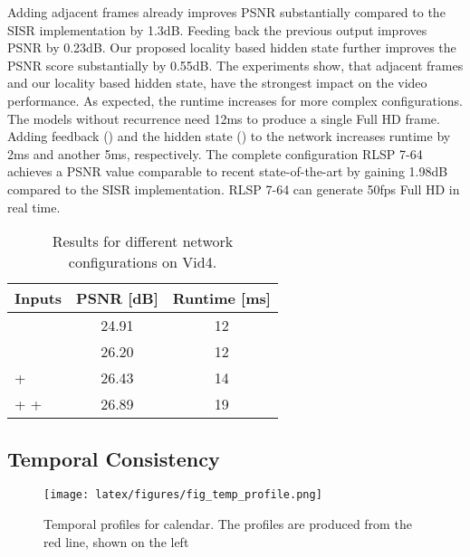 \documentclass[10pt,twocolumn,letterpaper]{article}
\begin{document}
Adding adjacent frames already improves PSNR substantially compared to the SISR implementation by 1.3dB. Feeding back the previous output improves PSNR by 0.23dB. Our proposed locality based hidden state further improves the PSNR score substantially by 0.55dB. The experiments show, that adjacent frames and our locality based hidden state, have the strongest impact on the video performance.
As expected, the runtime increases for more complex configurations. The models without recurrence need 12ms to produce a single Full HD frame. Adding feedback () and the hidden state () to the network increases runtime by 2ms and another 5ms, respectively. The complete configuration RLSP 7-64 achieves a PSNR value comparable to recent state-of-the-art by gaining 1.98dB compared to the SISR implementation. RLSP 7-64 can generate 50fps Full HD in real time.

\begin{table}[h!]
\begin{center}
\begin{tabular}{|l|c|c|}
\hline
Inputs & PSNR [dB] & Runtime [ms] \\
\hline\hline
 & 24.91 & 12 \\
 & 26.20 & 12 \\
 +  & 26.43 & 14 \\
 +  +  & 26.89 & 19 \\
\hline
\end{tabular}
\end{center}
\vspace{-0.14cm}
\caption{Results for different network configurations on Vid4.}
\label{tab:ablation}
\vspace{-0.14cm}
\end{table}


\subsection{Temporal Consistency}

\begin{figure*}
\begin{center}
\texttt{[image: latex/figures/fig\_temp\_profile.png]}
\end{center}
   \caption{Temporal profiles for calendar. The profiles are produced from the red line, shown on the left}
\label{fig:temp_profile}
\end{figure*}
\end{document}
